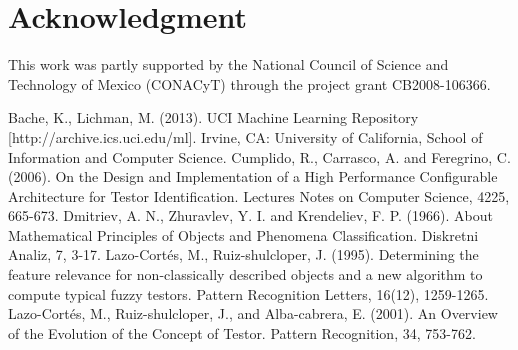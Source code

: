 \documentclass[conference]{IEEEtran}
\begin{document}
\section*{Acknowledgment}
This work was partly supported by the National Council of Science and Technology of
Mexico (CONACyT) through the project grant CB2008-106366.


\begin{thebibliography}{20}
Bache, K., Lichman, M. (2013). UCI Machine Learning Repository [http://archive.ics.uci.edu/ml]. Irvine, CA: University of California, School of Information and Computer Science.
 Cumplido, R., Carrasco, A. and Feregrino, C. (2006). On the Design and Implementation of a High Performance Configurable Architecture for Testor Identification. Lectures Notes on Computer Science, 4225, 665-673.
 Dmitriev, A. N.,  Zhuravlev, Y. I. and Krendeliev, F. P. (1966). About Mathematical Principles of Objects and Phenomena Classification. Diskretni Analiz, 7, 3-17.
Lazo-Cort\'es, M., Ruiz-shulcloper, J. (1995). Determining the feature relevance for non-classically described objects and a new algorithm to compute typical fuzzy testors. Pattern Recognition Letters, 16(12), 1259-1265.
Lazo-Cort\'es, M., Ruiz-shulcloper, J., and Alba-cabrera, E. (2001). An Overview of the Evolution of the Concept of Testor. Pattern Recognition, 34, 753-762.

\end{thebibliography}
\end{document}
